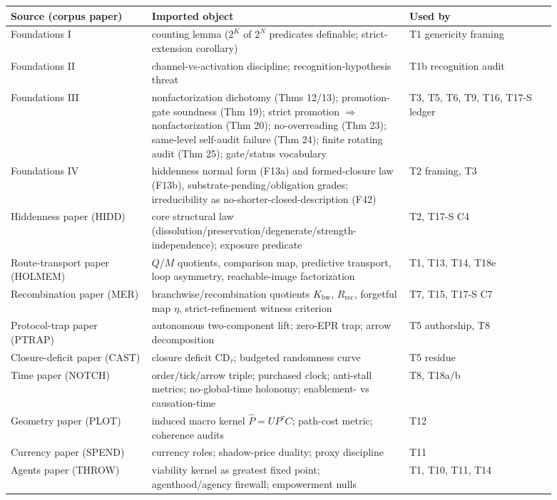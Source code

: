 \documentclass[11pt]{article}
\newcommand{\Kbw}{K_{\mathrm{bw}}}
\newcommand{\Rrec}{R_{\mathrm{rec}}}
\theoremstyle{definition}
\begin{document}
\begin{center}\footnotesize
\begin{tabular}{p{0.23\linewidth}p{0.42\linewidth}p{0.24\linewidth}}
\toprule
Source (corpus paper) & Imported object & Used by \\
\midrule
Foundations I & counting lemma ($2^K$ of $2^N$ predicates definable; strict-extension corollary) & T1 genericity framing \\
Foundations II & channel-vs-activation discipline; recognition-hypothesis threat & T1b recognition audit \\
Foundations III & nonfactorization dichotomy (Thms 12/13); promotion-gate soundness (Thm 19); strict promotion $\Rightarrow$ nonfactorization (Thm 20); no-overreading (Thm 23); same-level self-audit failure (Thm 24); finite rotating audit (Thm 25); gate/status vocabulary & T3, T5, T6, T9, T16, T17-S ledger \\
Foundations IV & hiddenness normal form (F13a) and formed-closure law (F13b), substrate-pending/obligation grades; irreducibility as no-shorter-closed-description (F42) & T2 framing, T3 \\
Hiddenness paper (HIDD) & core structural law (dissolution/preservation/degenerate/strength-independence); exposure predicate & T2, T17-S C4 \\
Route-transport paper (HOLMEM) & $Q$/$M$ quotients, comparison map, predictive transport, loop asymmetry, reachable-image factorization & T1, T13, T14, T18e \\
Recombination paper (MER) & branchwise/recombination quotients $\Kbw$, $\Rrec$, forgetful map $\eta$, strict-refinement witness criterion & T7, T15, T17-S C7 \\
Protocol-trap paper (PTRAP) & autonomous two-component lift; zero-EPR trap; arrow decomposition & T5 authorship, T8 \\
Closure-deficit paper (CAST) & closure deficit $\mathrm{CD}_\tau$; budgeted randomness curve & T5 residue \\
Time paper (NOTCH) & order/tick/arrow triple; purchased clock; anti-stall metrics; no-global-time holonomy; enablement- vs causation-time & T8, T18a/b \\
Geometry paper (PLOT) & induced macro kernel $\hat P = U P^\tau C$; path-cost metric; coherence audits & T12 \\
Currency paper (SPEND) & currency roles; shadow-price duality; proxy discipline & T11 \\
Agents paper (THROW) & viability kernel as greatest fixed point; agenthood/agency firewall; empowerment nulls & T1, T10, T11, T14 \\

\end{tabular}
\end{center}
\end{document}
